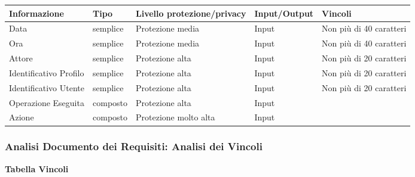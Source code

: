 \begin{tabular} {|P{3cm}|P{3cm}|P{3cm}|P{3cm}|P{3cm}|}
    \hline
    \textbf{Informazione}  & \textbf{Tipo} & \textbf{Livello protezione/privacy} & \textbf{Input/Output} & \textbf{Vincoli}        \\
    \hline
    Data                   & semplice      & Protezione media                    & Input                 & Non più di 40 caratteri \\
    \hline
    Ora                    & semplice      & Protezione media                    & Input                 & Non più di 40 caratteri \\
    \hline
    Attore                 & semplice      & Protezione alta                     & Input                 & Non più di 20 caratteri \\
    \hline
    Identificativo Profilo & semplice      & Protezione alta                     & Input                 & Non più di 20 caratteri \\
    \hline
    Identificativo Utente  & semplice      & Protezione alta                     & Input                 & Non più di 20 caratteri \\
    \hline
    Operazione Eseguita    & composto      & Protezione alta                     & Input                 &                         \\
    \hline
    Azione                 & composto      & Protezione molto alta               & Input                 &                         \\
    \hline
\end{tabular}

\newpage
\subsubsection{Analisi Documento dei Requisiti: Analisi dei Vincoli}
\hfill \break

\textbf{Tabella Vincoli}
\hfill \break


